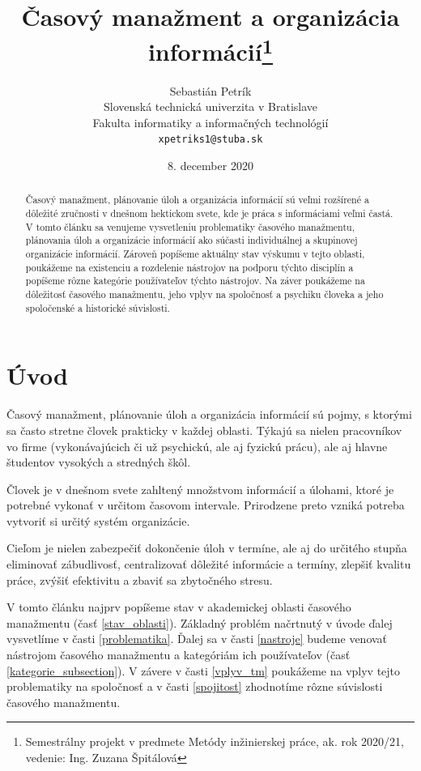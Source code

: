 \documentclass[10pt,slovak,a4paper]{article}
\title{Časový manažment a organizácia informácií\thanks{Semestrálny projekt v predmete Metódy inžinierskej práce, ak. rok 2020/21, vedenie: Ing. Zuzana Špitálová}}
\author{Sebastián Petrík\\[2pt]
	{\small Slovenská technická univerzita v Bratislave}\\
	{\small Fakulta informatiky a informačných technológií}\\
	{\small \texttt{xpetriks1@stuba.sk}}
	}
\date{\small 8. december 2020}
\begin{document}
\maketitle

\begin{abstract}
	
	Časový manažment, plánovanie úloh a organizácia informácií sú veľmi rozšírené a dôležité zručnosti v dnešnom hektickom svete, kde je práca s informáciami veľmi častá. V tomto článku sa venujeme vysvetleniu problematiky časového manažmentu, plánovania úloh a organizácie informácií ako súčasti individuálnej a skupinovej organizácie informácií. Zároveň popíšeme aktuálny stav výskumu v tejto oblasti, poukážeme na existenciu a rozdelenie nástrojov na podporu týchto disciplín a popíšeme rôzne kategórie používateľov týchto nástrojov. Na záver poukážeme na dôležitosť časového manažmentu, jeho vplyv na spoločnosť a psychiku človeka a jeho spoločenské a historické súvislosti.

\end{abstract}
\newpage

\section{Úvod} \label{uvod}

	Časový manažment, plánovanie úloh a organizácia informácií sú pojmy, s ktorými sa často stretne človek prakticky v každej oblasti. Týkajú sa nielen pracovníkov vo firme (vykonávajúcich či už psychickú, ale aj fyzickú prácu), ale aj hlavne študentov vysokých a stredných škôl.
	
	Človek je v dnešnom svete zahltený množstvom informácií a úlohami, ktoré je potrebné vykonať v určitom časovom intervale. Prirodzene preto vzniká potreba vytvoriť si určitý systém organizácie.
	
	Cieľom je nielen zabezpečiť dokončenie úloh v termíne, ale aj do určitého stupňa eliminovať zábudlivosť, centralizovať dôležité informácie a termíny, zlepšiť kvalitu práce, zvýšiť efektivitu a zbaviť sa zbytočného stresu.
	
	V tomto článku najprv popíšeme stav v akademickej oblasti časového manažmentu (časť \ref{stav_oblasti}). Základný problém načrtnutý v úvode ďalej vysvetlíme v časti \ref{problematika}. Ďalej sa v časti \ref{nastroje} budeme venovať nástrojom časového manažmentu a kategóriám ich používateľov (časť \ref{kategorie_subsection}). V závere v časti \ref{vplyv_tm} poukážeme na vplyv tejto problematiky na spoločnosť a v časti \ref{spojitost} zhodnotíme rôzne súvislosti časového manažmentu.
	
\end{document}
